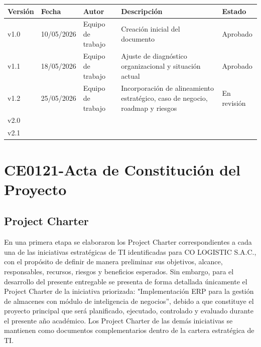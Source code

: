 \documentclass[11pt, a4paper, oneside]{report}
\begin{document}
{\centering
\begin{tabular}{@{}|C{1.5cm}|C{2.2cm}|L{3cm}|L{5cm}|C{2cm}|@{}}

  {\color{white}\bfseries\small Versión} &
  {\color{white}\bfseries\small Fecha} &
  {\color{white}\bfseries\small Autor} &
  {\color{white}\bfseries\small Descripción} &
  {\color{white}\bfseries\small Estado} \\ \hline

  \small v1.0 & \small 10/05/2026 & \small Equipo de trabajo &
  \small Creación inicial del documento & \small Aprobado \\ \hline

  \small v1.1 & \small 18/05/2026 & \small Equipo de trabajo &
  \small Ajuste de diagnóstico organizacional y situación actual & \small Aprobado \\ \hline

  \small v1.2 & \small 25/05/2026 & \small Equipo de trabajo &
  \small Incorporación de alineamiento estratégico, caso de negocio, roadmap y riesgos & \small En revisión \\ \hline

  \small v2.0 & \small & \small & \small & \small \\ \hline
  \small v2.1 & \small & \small & \small & \small \\ \hline
\end{tabular}
\par}

\vspace*{\fill}

\newpage
\pagestyle{fancy}
\tableofcontents
\clearpage
{}


\chapter{CE0121-Acta de Constitución del Proyecto}

\section{Project Charter}

En una primera etapa se elaboraron los Project Charter correspondientes a cada una de las iniciativas estratégicas de TI identificadas para CO LOGISTIC S.A.C., con el propósito de definir de manera preliminar sus objetivos, alcance, responsables, recursos, riesgos y beneficios esperados. Sin embargo, para el desarrollo del presente entregable se presenta de forma detallada únicamente el Project Charter de la iniciativa priorizada: "Implementación ERP para la gestión de almacenes con módulo de inteligencia de negocios”, debido a que constituye el proyecto principal que será planificado, ejecutado, controlado y evaluado durante el presente año académico. Los Project Charter de las demás iniciativas se mantienen como documentos complementarios dentro de la cartera estratégica de TI.
\end{document}
